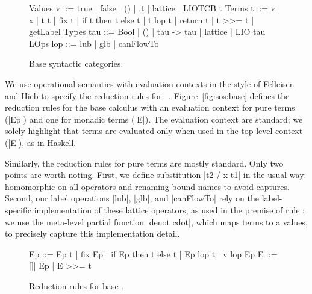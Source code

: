 \begin{figure}
\small
\centering
\begin{code}
Values  v    ::=  true | false | () | \x.t | lattice | LIOTCB t
Terms   t    ::=  v | x | t t | fix t | if t then t else t
               |  t lop t | return t | t >>= t | getLabel
Types   tau  ::=  Bool | () | tau -> tau | lattice | LIO tau  
LOps    lop  ::=  lub | glb | canFlowTo
\end{code}
\caption{Base \lio{} syntactic categories.
\label{fig:language:base}}
\end{figure}

We use operational semantics with evaluation contexts in the style of
Felleisen and Hieb to specify the reduction rules for \lio~\tocite{}.
%
Figure~\ref{fig:sos:base} defines the reduction rules for the base
calculus with an evaluation context for pure
terms (|Ep|) and one for monadic terms (|E|).
%
The evaluation context are standard; we solely highlight that terms
are evaluated only when used in the top-level context (|E|), as in
Haskell.

Similarly, the reduction rules for pure terms are mostly standard.
%
Only two points are worth noting.
%
First, we define substitution |{t2 / x } t1| in the usual way:
homomorphic on all operators and renaming bound names to avoid
captures. 
%
Second, our label operations |lub|, |glb|, and |canFlowTo| rely on the
label-specific implementation of these lattice operators, as used in
the premise of rule ;
%
we use the meta-level partial function |denot cdot|, which maps terms
to a values, to precisely capture this implementation detail.

\begin{figure}[t] %
\small
\begin{code}
Ep  ::= Ep t | fix Ep | if Ep then t else t | Ep lop t | v lop Ep
E   ::= []| Ep | E >>= t 
\end{code}

\caption{Reduction rules for base \lio.\label{lio:sos:base}}
\end{figure}

